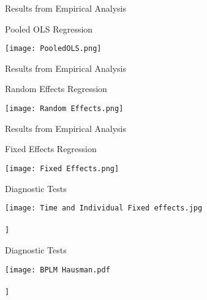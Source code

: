 \documentclass{beamer}
\begin{document}
	\begin{frame}{Results from Empirical Analysis}
		\begin{exampleblock}{Pooled OLS Regression}
			\begin{center}
				\texttt{[image: PooledOLS.png]}
			\end{center} 
		\end{exampleblock}
	\end{frame}
	
	\begin{frame}{Results from Empirical Analysis}
		\begin{exampleblock}{Random Effects Regression}
			\begin{center}
				\texttt{[image: Random Effects.png]}
			\end{center} 
		\end{exampleblock}
	\end{frame}
	
	\begin{frame}{Results from Empirical Analysis}
		\begin{exampleblock}{Fixed Effects Regression}
			\begin{center}
				\texttt{[image: Fixed Effects.png]}
			\end{center} 
		\end{exampleblock}
	\end{frame}
	
\begin{frame}{Diagnostic Tests}
	\begin{exampleblock}{}
		\begin{center}
			\texttt{[image: Time and Individual Fixed effects.jpg\\\\
			]}
		\end{center} 
	\end{exampleblock}
\end{frame}	
	
\begin{frame}{Diagnostic Tests}
	\begin{exampleblock}{}
		\begin{center}
			\texttt{[image: BPLM Hausman.pdf\\\\
			]}
		\end{center} 
	\end{exampleblock}
\end{frame}		
	
\end{document}
